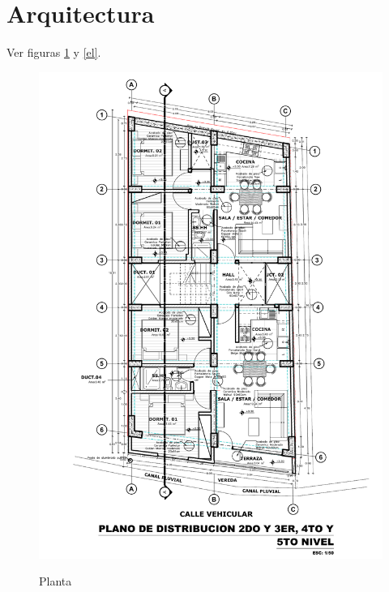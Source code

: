 \section{Arquitectura}
Ver figuras \ref{pl} y \ref{el}.
\begin{figure}[h!]
    \centering
    \caption{Planta}
    \includegraphics[scale=0.7]{IMAGENES/Plano.pdf}
    \label{pl}
\end{figure}

